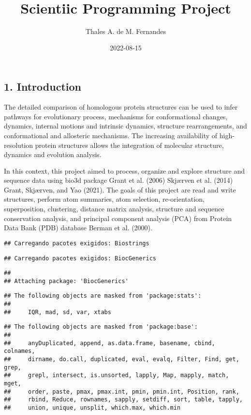 \documentclass[
]{article}
\title{Scientiic Programming Project}
\author{Thales A. de M. Fernandes}
\date{2022-08-15}
\begin{document}
\maketitle

\hypertarget{introduction}{%
\subsection{1. Introduction}\label{introduction}}

The detailed comparison of homologous protein structures can be used to
infer pathways for evolutionary process, mechanisms for conformational
changes, dynamics, internal motions and intrinsic dynamics, structure
rearrangements, and conformational and allosteric mechanisms. The
increasing availability of high-resolution protein structures allows the
integration of molecular structure, dynamics and evolution analysis.

In this context, this project aimed to process, organize and explore
structure and sequence data using bio3d package Grant et al. (2006)
Skjærven et al. (2014) Grant, Skjærven, and Yao (2021). The goals of
this project are read and write structures, perform atom summaries, atom
selection, re-orientation, superposition, clustering, distance matrix
analysis, structure and sequence conservation analysis, and principal
component analysis (PCA) from Protein Data Bank (PDB) database Berman et
al. (2000).

\begin{verbatim}
## Carregando pacotes exigidos: Biostrings
\end{verbatim}

\begin{verbatim}
## Carregando pacotes exigidos: BiocGenerics
\end{verbatim}

\begin{verbatim}
## 
## Attaching package: 'BiocGenerics'
\end{verbatim}

\begin{verbatim}
## The following objects are masked from 'package:stats':
## 
##     IQR, mad, sd, var, xtabs
\end{verbatim}

\begin{verbatim}
## The following objects are masked from 'package:base':
## 
##     anyDuplicated, append, as.data.frame, basename, cbind, colnames,
##     dirname, do.call, duplicated, eval, evalq, Filter, Find, get, grep,
##     grepl, intersect, is.unsorted, lapply, Map, mapply, match, mget,
##     order, paste, pmax, pmax.int, pmin, pmin.int, Position, rank,
##     rbind, Reduce, rownames, sapply, setdiff, sort, table, tapply,
##     union, unique, unsplit, which.max, which.min
\end{verbatim}
\end{document}
